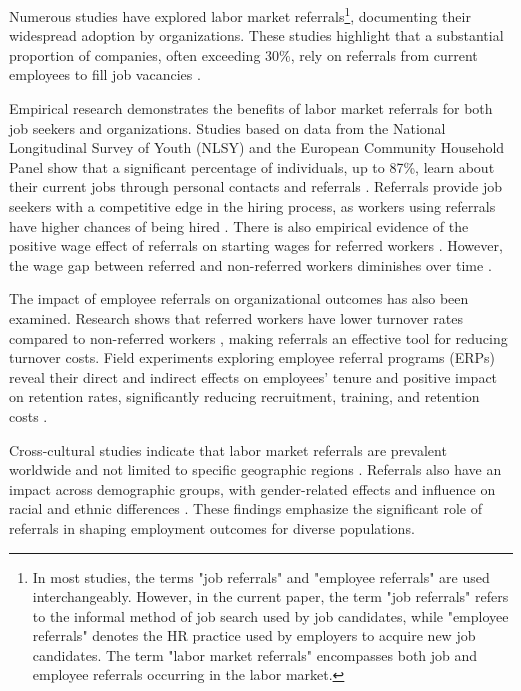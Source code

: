 \documentclass[12pt]{article}
\begin{document}
Numerous studies have explored labor market referrals\footnote{In most studies, the terms "job referrals" and "employee referrals" are used interchangeably. However, in the current paper, the term "job referrals" refers to the informal method of job search used by job candidates, while "employee referrals" denotes the HR practice used by employers to acquire new job candidates. The term "labor market referrals" encompasses both job and employee referrals occurring in the labor market.}, documenting their widespread adoption by organizations. These studies highlight that a substantial proportion of companies, often exceeding 30\%, rely on referrals from current employees to fill job vacancies \citep{holzer1987hiring, neckerman1991hiring, marsden2001social}.

Empirical research demonstrates the benefits of labor market referrals for both job seekers and organizations. Studies based on data from the National Longitudinal Survey of Youth (NLSY) and the European Community Household Panel show that a significant percentage of individuals, up to 87\%, learn about their current jobs through personal contacts and referrals \citep{holzer1987job, pellizzari2010friends}. Referrals provide job seekers with a competitive edge in the hiring process, as workers using referrals have higher chances of being hired \citep{burks2015value}. There is also empirical evidence of the positive wage effect of referrals on starting wages for referred workers \citep{corcoran1980most, montgomery1991social, simon1992matchmaker, galenianos2013learning, brown2016informal, dustmann2016referral}. However, the wage gap between referred and non-referred workers diminishes over time \citep{simon1992matchmaker, galenianos2013learning, brown2016informal, dustmann2016referral}.

The impact of employee referrals on organizational outcomes has also been examined. Research shows that referred workers have lower turnover rates compared to non-referred workers \citep{simon1992matchmaker, dustmann2016referral, brown2016informal}, making referrals an effective tool for reducing turnover costs. Field experiments exploring employee referral programs (ERPs) reveal their direct and indirect effects on employees' tenure and positive impact on retention rates, significantly reducing recruitment, training, and retention costs \citep{friebel2023employee}.

Cross-cultural studies indicate that labor market referrals are prevalent worldwide and not limited to specific geographic regions \citep{alon1997job, wahba2005density, yakubovich2005weak}. Referrals also have an impact across demographic groups, with gender-related effects \citep{corcoran1980most, morrison1990women, lalanne2016old} and influence on racial and ethnic differences \cite{datcher1983impact, green1999racial, loury2006some}. These findings emphasize the significant role of referrals in shaping employment outcomes for diverse populations.
\end{document}
